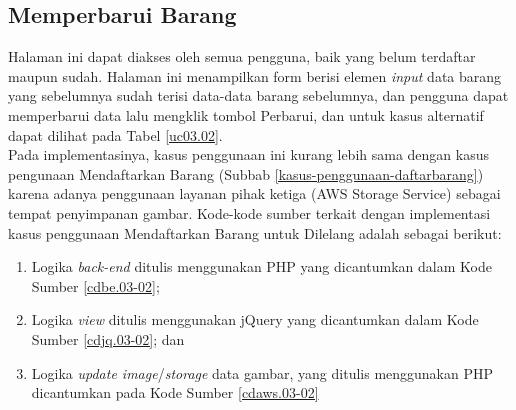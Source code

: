 \subsection{Memperbarui Barang}
Halaman ini dapat diakses oleh semua pengguna, baik yang belum terdaftar maupun sudah. Halaman ini menampilkan form berisi elemen \textit{input} data barang yang sebelumnya sudah terisi data-data barang sebelumnya, dan pengguna dapat memperbarui data lalu mengklik tombol Perbarui, dan untuk kasus alternatif dapat dilihat pada Tabel \ref{uc03.02}.\\
\indent Pada implementasinya, kasus penggunaan ini kurang lebih sama dengan kasus pengunaan Mendaftarkan Barang (Subbab \ref{kasus-penggunaan-daftarbarang}) karena adanya penggunaan layanan pihak ketiga (AWS Storage Service) sebagai tempat penyimpanan gambar. Kode-kode sumber terkait dengan implementasi kasus penggunaan Mendaftarkan Barang untuk Dilelang adalah sebagai berikut:
\begin{enumerate}
	\item Logika \textit{back-end} ditulis menggunakan PHP yang dicantumkan dalam Kode Sumber \ref{cdbe.03-02}; 
	\item Logika \textit{view} ditulis menggunakan jQuery yang dicantumkan dalam Kode Sumber \ref{cdjq.03-02}; dan
	\item Logika \textit{update image}/\textit{storage} data gambar, yang ditulis menggunakan PHP dicantumkan pada Kode Sumber \ref{cdaws.03-02}
\end{enumerate} 

